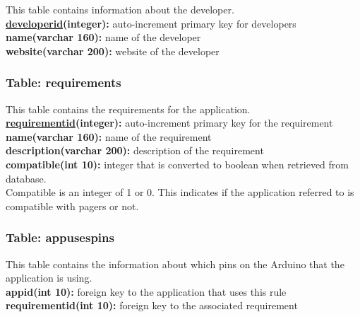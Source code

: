 			This table contains information about the developer. \\
			{\bf \underline{developerid}(integer):} auto-increment primary key for developers \\
			\textbf{name(varchar 160):} name of the developer \\
			\textbf{website(varchar 200):} website of the developer \\

		\subsubsection{Table: requirements}

			This table contains the requirements for the application. \\
			{\bf \underline{requirementid}(integer):} auto-increment primary key for the requirement \\
			\textbf{name(varchar 160):} name of the requirement \\
			\textbf{description(varchar 200):} description of the requirement \\
			\textbf{compatible(int 10):} integer that is converted to boolean when retrieved from database. \\

			Compatible is an integer of 1 or 0. This indicates if the application referred to is compatible with pagers or not.

		\subsubsection{Table: appusespins}

			This table contains the information about which pins on the Arduino that the application is using. \\
			\textbf{appid(int 10):} foreign key to the application that uses this rule \\
			\textbf{requirementid(int 10):} foreign key to the associated requirement \\

